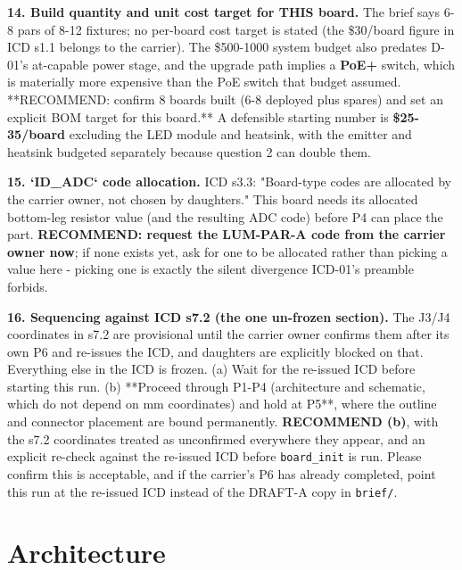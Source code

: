 \documentclass[11pt,a4paper]{article}
\begin{document}
\textbf{14. Build quantity and unit cost target for THIS board.} The brief says 6-8 pars of 8-12 fixtures; no per-board cost target is stated (the \$30/board figure in ICD s1.1 belongs to the carrier). The \$500-1000 system budget also predates D-01's at-capable power stage, and the upgrade path implies a \textbf{PoE+} switch, which is materially more expensive than the PoE switch that budget assumed. {*}{*}RECOMMEND: confirm 8 boards built (6-8 deployed plus spares) and set an explicit BOM target for this board.{*}{*} A defensible starting number is \textbf{\$25-35/board} excluding the LED module and heatsink, with the emitter and heatsink budgeted separately because question 2 can double them.

\textbf{15. `ID\_ADC` code allocation.} ICD s3.3: "Board-type codes are allocated by the carrier owner, not chosen by daughters." This board needs its allocated bottom-leg resistor value (and the resulting ADC code) before P4 can place the part. \textbf{RECOMMEND: request the LUM-PAR-A code from the carrier owner now}; if none exists yet, ask for one to be allocated rather than picking a value here - picking one is exactly the silent divergence ICD-01's preamble forbids.

\textbf{16. Sequencing against ICD s7.2 (the one un-frozen section).} The J3/J4 coordinates in s7.2 are provisional until the carrier owner confirms them after its own P6 and re-issues the ICD, and daughters are explicitly blocked on that. Everything else in the ICD is frozen. (a) Wait for the re-issued ICD before starting this run. (b) {*}{*}Proceed through P1-P4 (architecture and schematic, which do not depend on mm coordinates) and hold at P5{*}{*}, where the outline and connector placement are bound permanently. \textbf{RECOMMEND (b)}, with the s7.2 coordinates treated as unconfirmed everywhere they appear, and an explicit re-check against the re-issued ICD before \texttt{board\_init} is run. Please confirm this is acceptable, and if the carrier's P6 has already completed, point this run at the re-issued ICD instead of the DRAFT-A copy in \texttt{brief/}.

\section{Architecture}
\end{document}
